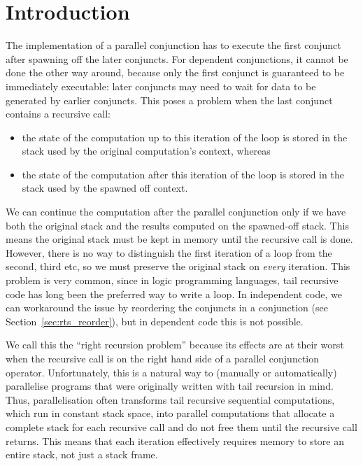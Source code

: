 \section{Introduction}
\label{sec:lc_intro}


The implementation of a parallel conjunction
has to execute the first conjunct after spawning off the later conjuncts.
For dependent conjunctions, it cannot be done the other way around,
because only the first conjunct is guaranteed to be immediately executable:
later conjuncts may need to wait for data to be generated by earlier
conjuncts.
This poses a problem when the last conjunct contains a recursive call:
\begin{itemize}
\item
the state of the computation up to this iteration of the loop
is stored in the stack used by the original computation's context,
whereas
\item
the state of the computation after this iteration of the loop
is stored in the stack used by the spawned off context.
\end{itemize}
We can continue the computation after the parallel conjunction
only if we have both the original stack
and the results computed on the spawned-off stack.
This means the original stack must be kept in memory
until the recursive call is done.
However, there is no way to distinguish
the first iteration of a loop from the second, third etc,
so we must preserve the original stack on \emph{every} iteration.
This problem is very common,
since in logic programming languages,
tail recursive code has long been the preferred way to write a loop.
In independent code,
we can workaround the issue by reordering the conjuncts
in a conjunction (see Section~\ref{sec:rts_reorder}),
but in dependent code this is not possible.

We call this the ``right recursion problem'' because its effects are at
their worst when the recursive call is on the right hand side of a
parallel conjunction operator.
Unfortunately,
this is a natural way to (manually or automatically) parallelise programs
that were originally written with tail recursion in mind.
Thus, parallelisation often
transforms tail recursive sequential computations,
which run in constant stack space,
into parallel computations
that allocate a complete stack for each recursive call
and do not free them until the recursive call returns.
This means that each iteration effectively requires memory
to store an entire stack, not just a stack frame.

